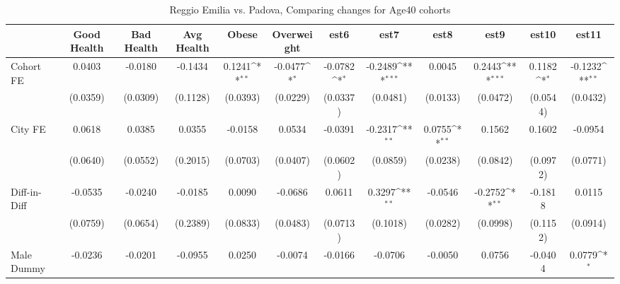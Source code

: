 \begin{table}[htbp]\centering
\def\sym#1{\ifmmode^{#1}\else\(^{#1}\)\fi}
\caption{Reggio Emilia vs. Padova, Comparing changes for Age40 cohorts}
\begin{tabular}{l*{11}{c}}
\toprule
            &\multicolumn{1}{c}{Good Health}&\multicolumn{1}{c}{Bad Health}&\multicolumn{1}{c}{Avg Health}&\multicolumn{1}{c}{Obese}&\multicolumn{1}{c}{Overweight}&\multicolumn{1}{c}{est6}&\multicolumn{1}{c}{est7}&\multicolumn{1}{c}{est8}&\multicolumn{1}{c}{est9}&\multicolumn{1}{c}{est10}&\multicolumn{1}{c}{est11}\\
\midrule
Cohort FE   &      0.0403         &     -0.0180         &     -0.1434         &      0.1241\sym{**} &     -0.0477\sym{*}  &     -0.0782\sym{*}  &     -0.2489\sym{***}&      0.0045         &      0.2443\sym{***}&      0.1182\sym{*}  &     -0.1232\sym{**} \\
            &    (0.0359)         &    (0.0309)         &    (0.1128)         &    (0.0393)         &    (0.0229)         &    (0.0337)         &    (0.0481)         &    (0.0133)         &    (0.0472)         &    (0.0544)         &    (0.0432)         \\
\addlinespace
City FE     &      0.0618         &      0.0385         &      0.0355         &     -0.0158         &      0.0534         &     -0.0391         &     -0.2317\sym{**} &      0.0755\sym{**} &      0.1562         &      0.1602         &     -0.0954         \\
            &    (0.0640)         &    (0.0552)         &    (0.2015)         &    (0.0703)         &    (0.0407)         &    (0.0602)         &    (0.0859)         &    (0.0238)         &    (0.0842)         &    (0.0972)         &    (0.0771)         \\
\addlinespace
Diff-in-Diff&     -0.0535         &     -0.0240         &     -0.0185         &      0.0090         &     -0.0686         &      0.0611         &      0.3297\sym{**} &     -0.0546         &     -0.2752\sym{**} &     -0.1818         &      0.0115         \\
            &    (0.0759)         &    (0.0654)         &    (0.2389)         &    (0.0833)         &    (0.0483)         &    (0.0713)         &    (0.1018)         &    (0.0282)         &    (0.0998)         &    (0.1152)         &    (0.0914)         \\
\addlinespace
Male Dummy  &     -0.0236         &     -0.0201         &     -0.0955         &      0.0250         &     -0.0074         &     -0.0166         &     -0.0706         &     -0.0050         &      0.0756         &     -0.0404         &      0.0779\sym{*}  \\

\end{tabular}
\end{table}
